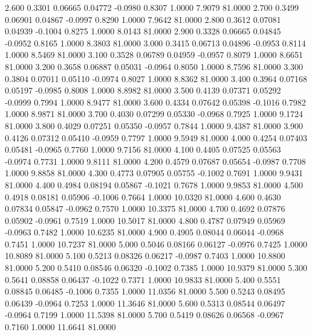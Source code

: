   2.600   0.3301   0.06665   0.04772  -0.0980   0.8307   1.0000   7.9079  81.0000
   2.700   0.3499   0.06901   0.04867  -0.0997   0.8290   1.0000   7.9642  81.0000
   2.800   0.3612   0.07081   0.04939  -0.1004   0.8275   1.0000   8.0143  81.0000
   2.900   0.3328   0.06665   0.04845  -0.0952   0.8165   1.0000   8.3803  81.0000
   3.000   0.3415   0.06713   0.04896  -0.0953   0.8114   1.0000   8.5469  81.0000
   3.100   0.3528   0.06789   0.04959  -0.0957   0.8079   1.0000   8.6651  81.0000
   3.200   0.3658   0.06887   0.05031  -0.0964   0.8050   1.0000   8.7596  81.0000
   3.300   0.3804   0.07011   0.05110  -0.0974   0.8027   1.0000   8.8362  81.0000
   3.400   0.3964   0.07168   0.05197  -0.0985   0.8008   1.0000   8.8982  81.0000
   3.500   0.4139   0.07371   0.05292  -0.0999   0.7994   1.0000   8.9477  81.0000
   3.600   0.4334   0.07642   0.05398  -0.1016   0.7982   1.0000   8.9871  81.0000
   3.700   0.4030   0.07299   0.05330  -0.0968   0.7925   1.0000   9.1724  81.0000
   3.800   0.4029   0.07251   0.05350  -0.0957   0.7844   1.0000   9.4387  81.0000
   3.900   0.4126   0.07312   0.05410  -0.0959   0.7797   1.0000   9.5949  81.0000
   4.000   0.4254   0.07403   0.05481  -0.0965   0.7760   1.0000   9.7156  81.0000
   4.100   0.4405   0.07525   0.05563  -0.0974   0.7731   1.0000   9.8111  81.0000
   4.200   0.4579   0.07687   0.05654  -0.0987   0.7708   1.0000   9.8858  81.0000
   4.300   0.4773   0.07905   0.05755  -0.1002   0.7691   1.0000   9.9431  81.0000
   4.400   0.4984   0.08194   0.05867  -0.1021   0.7678   1.0000   9.9853  81.0000
   4.500   0.4918   0.08181   0.05906  -0.1006   0.7664   1.0000  10.0320  81.0000
   4.600   0.4630   0.07834   0.05847  -0.0962   0.7570   1.0000  10.3375  81.0000
   4.700   0.4692   0.07876   0.05902  -0.0961   0.7519   1.0000  10.5017  81.0000
   4.800   0.4787   0.07949   0.05969  -0.0963   0.7482   1.0000  10.6235  81.0000
   4.900   0.4905   0.08044   0.06044  -0.0968   0.7451   1.0000  10.7237  81.0000
   5.000   0.5046   0.08166   0.06127  -0.0976   0.7425   1.0000  10.8089  81.0000
   5.100   0.5213   0.08326   0.06217  -0.0987   0.7403   1.0000  10.8800  81.0000
   5.200   0.5410   0.08546   0.06320  -0.1002   0.7385   1.0000  10.9379  81.0000
   5.300   0.5641   0.08858   0.06437  -0.1022   0.7371   1.0000  10.9833  81.0000
   5.400   0.5551   0.08845   0.06485  -0.1006   0.7355   1.0000  11.0356  81.0000
   5.500   0.5243   0.08495   0.06439  -0.0964   0.7253   1.0000  11.3646  81.0000
   5.600   0.5313   0.08544   0.06497  -0.0964   0.7199   1.0000  11.5398  81.0000
   5.700   0.5419   0.08626   0.06568  -0.0967   0.7160   1.0000  11.6641  81.0000
